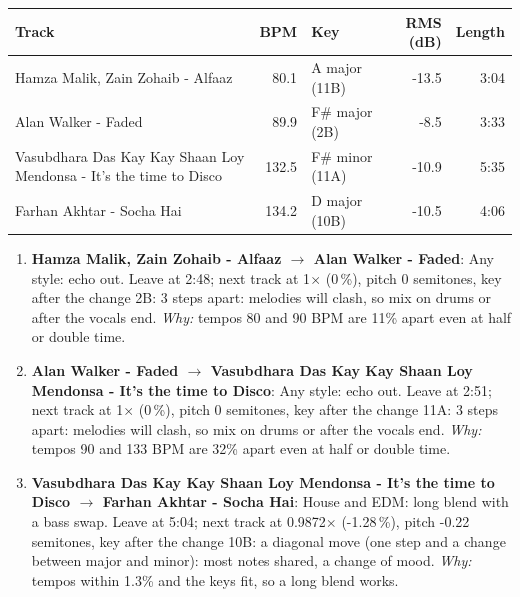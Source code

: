 \begin{tabularx}{\linewidth}{@{}Xrlrr@{}}\toprule
Track & BPM & Key & RMS (dB) & Length \\\midrule
Hamza Malik, Zain Zohaib - Alfaaz & 80.1 & A major (11B) & -13.5 & 3:04 \\
Alan Walker - Faded & 89.9 & F\# major (2B) & -8.5 & 3:33 \\
Vasubdhara Das Kay Kay Shaan Loy Mendonsa - It's the time to Disco & 132.5 & F\# minor (11A) & -10.9 & 5:35 \\
Farhan Akhtar - Socha Hai & 134.2 & D major (10B) & -10.5 & 4:06 \\
\bottomrule\end{tabularx}

\begin{enumerate}
\item \textbf{Hamza Malik, Zain Zohaib - Alfaaz $\to$ Alan Walker - Faded}: Any style: echo out. Leave at 2:48; next track at 1$\times$ (0\,\%), pitch 0 semitones, key after the change 2B: 3 steps apart: melodies will clash, so mix on drums or after the vocals end. \emph{Why:} tempos 80 and 90 BPM are 11\% apart even at half or double time.
\item \textbf{Alan Walker - Faded $\to$ Vasubdhara Das Kay Kay Shaan Loy Mendonsa - It's the time to Disco}: Any style: echo out. Leave at 2:51; next track at 1$\times$ (0\,\%), pitch 0 semitones, key after the change 11A: 3 steps apart: melodies will clash, so mix on drums or after the vocals end. \emph{Why:} tempos 90 and 133 BPM are 32\% apart even at half or double time.
\item \textbf{Vasubdhara Das Kay Kay Shaan Loy Mendonsa - It's the time to Disco $\to$ Farhan Akhtar - Socha Hai}: House and EDM: long blend with a bass swap. Leave at 5:04; next track at 0.9872$\times$ (-1.28\,\%), pitch -0.22 semitones, key after the change 10B: a diagonal move (one step and a change between major and minor): most notes shared, a change of mood. \emph{Why:} tempos within 1.3\% and the keys fit, so a long blend works.
\end{enumerate}
